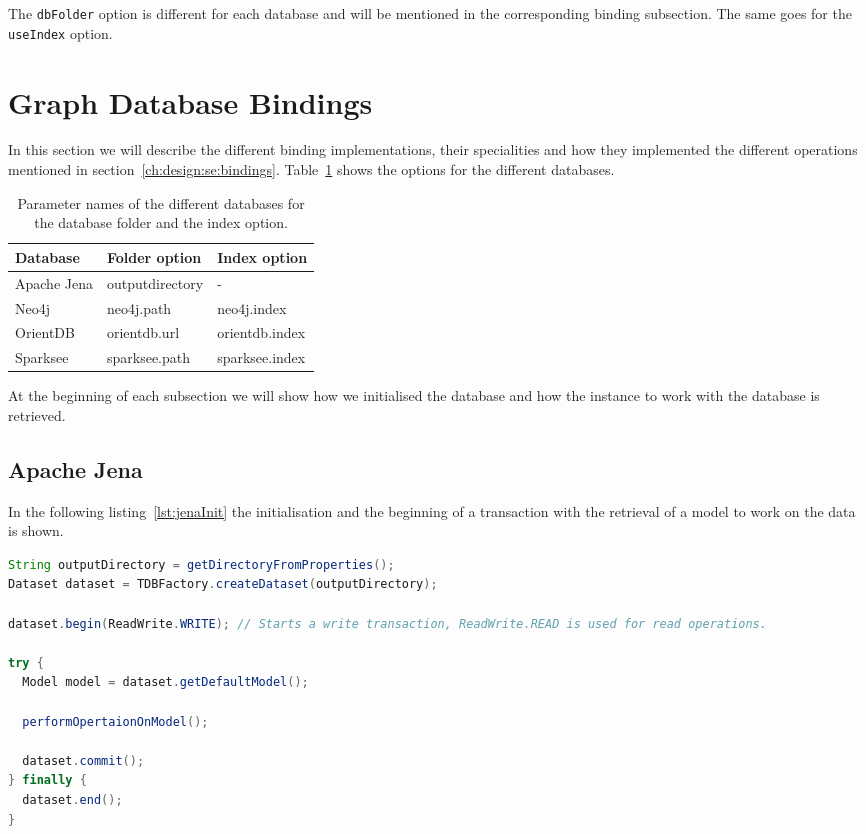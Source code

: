 The \texttt{dbFolder} option is different for each database and will be mentioned in the corresponding binding subsection.
The same goes for the \texttt{useIndex} option.

\section{Graph Database Bindings}
\label{ch:implementation:se:graphDatabaseBindings}
In this section we will describe the different binding implementations, their specialities and how they implemented the different operations mentioned in section~\ref{ch:design:se:bindings}.
Table~\ref{tab:bindingParameterMapping} shows the options for the different databases.

\begin{table}
  \begin{minipage}{\textwidth}
    \begin{tabularx}{\textwidth}{ | X | X | X | }
      \hline
      Database & Folder option & Index option \\ \hline \hline
      Apache Jena & outputdirectory & - \\ \hline
      Neo4j & neo4j.path & neo4j.index \\ \hline
      OrientDB & orientdb.url & orientdb.index \\ \hline
      Sparksee & sparksee.path & sparksee.index \\ \hline
    \end{tabularx}
  \end{minipage}
  \caption{Parameter names of the different databases for the database folder and the index option.}
  \label{tab:bindingParameterMapping}
\end{table}

At the beginning of each subsection we will show how we initialised the database and how the instance to work with the database is retrieved.

\subsection{Apache Jena}
In the following listing~\ref{lst:jenaInit} the initialisation and the beginning of a transaction with the retrieval of a model to work on the data is shown.

\begin{lstlisting}[language=Java,label={lst:jenaInit},caption={Implementation of the initialisation and model retrieval in Jena.}]
String outputDirectory = getDirectoryFromProperties();
Dataset dataset = TDBFactory.createDataset(outputDirectory);

dataset.begin(ReadWrite.WRITE); // Starts a write transaction, ReadWrite.READ is used for read operations.

try {
  Model model = dataset.getDefaultModel();

  performOpertaionOnModel();

  dataset.commit();
} finally {
  dataset.end();
}
\end{lstlisting}

